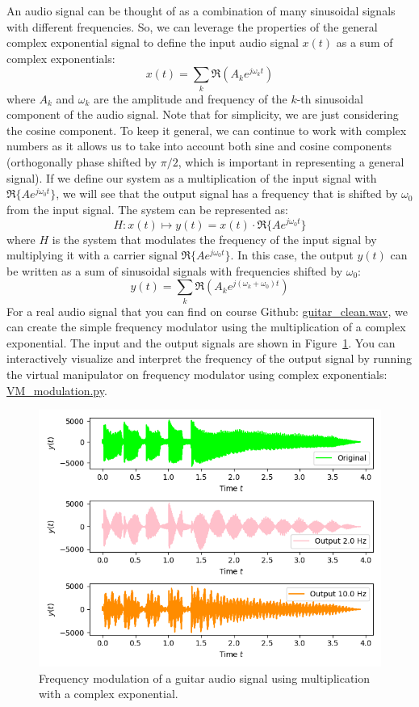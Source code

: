 \documentclass{ee102_notes}
\begin{document}
An audio signal can be thought of as a combination of many sinusoidal signals with different frequencies. So, we can leverage the properties of the general complex exponential signal to define the input audio signal $x(t)$ as a sum of complex exponentials:
\[
    x(t) = \sum_{k} \Re\left(A_k e^{j\omega_k t}\right)
\]
where $A_k$ and $\omega_k$ are the amplitude and frequency of the $k$-th sinusoidal component of the audio signal. Note that for simplicity, we are just considering the cosine component. To keep it general, we can continue to work with complex numbers as it allows us to take into account both sine and cosine components (orthogonally phase shifted by $\pi/2$, which is important in representing a general signal). If we define our system as a multiplication of the input signal with $\Re\{A e^{j\omega_0 t}\}$, we will see that the output signal has a frequency that is shifted by $\omega_0$ from the input signal. The system can be represented as:
\[
    H: x(t) \mapsto y(t) = x(t) \cdot \Re\{A e^{j\omega_0 t}\}
\]
where $H$ is the system that modulates the frequency of the input signal by multiplying it with a carrier signal $\Re\{A e^{j\omega_0 t}\}$. In this case, the output $y(t)$ can be written as a sum of sinusoidal signals with frequencies shifted by $\omega_0$:
\[
    y(t) = \sum_{k} \Re\left(A_k e^{j(\omega_k + \omega_0) t}\right)
\]
For a real audio signal that you can find on course Github: \href{https://github.com/ee-ucmerced/ee102-signals-systems/blob/main/lecture\_notes/week3\_systems/guitar\_clean.wav}{guitar\_clean.wav}, we can create the simple frequency modulator using the multiplication of a complex exponential. The input and the output signals are shown in Figure~\ref{fig:fm_guitar}. You can interactively visualize and interpret the frequency of the output signal by running the virtual manipulator on frequency modulator using complex exponentials: \href{https://github.com/ee-ucmerced/ee102-signals-systems/blob/main/lecture\_notes/week3\_systems/VM\_modulation.py}{VM\_modulation.py}.
\begin{figure}[ht]
    \centering
    \includegraphics[width=\textwidth]{figs/fm_guitar.png} 
    \caption{Frequency modulation of a guitar audio signal using multiplication with a complex exponential.}
    \label{fig:fm_guitar}
\end{figure}
\end{document}

